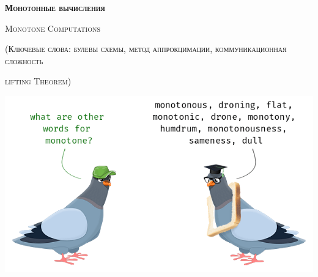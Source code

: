 


\thispagestyle{empty}

\centerline{\large \textsc{\textbf{Монотонные вычисления}}}
\centerline{\textsc{Monotone Computations}}
\centerline{\small \textsc{(Ключевые слова: булевы схемы, метод аппрокцимации, коммуникационная
        сложность}}
\centerline{\small \textsc{lifting Theorem)}}

\bigskip



\vspace{1cm}

\begin{center}
    \includegraphics[scale = 0.5]{pics/monotone.png}
\end{center}

\vspace{1cm}


\nocite{*}
\printbibliography



